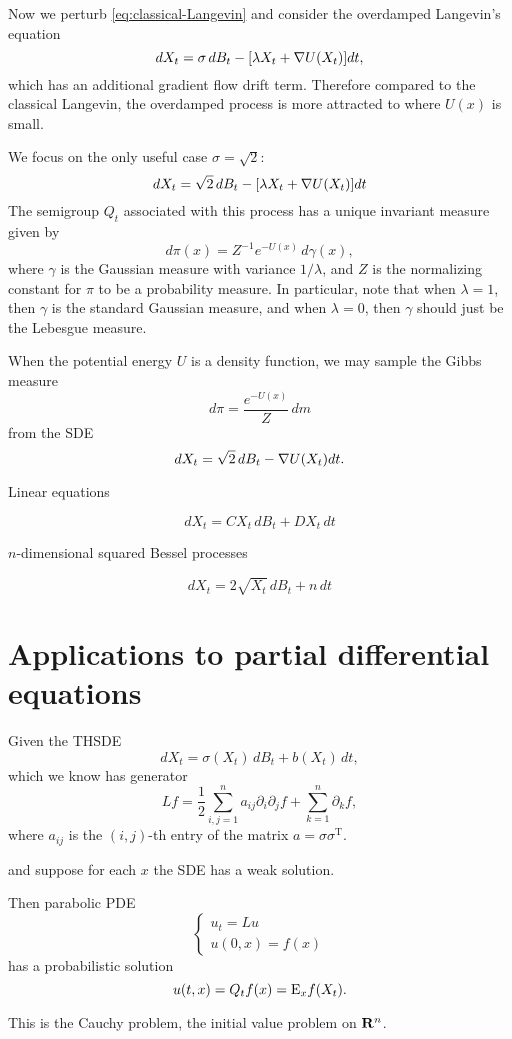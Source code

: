 \documentclass[10pt]{book}
\begin{document}
Now we perturb \eqref{eq:classical-Langevin} and consider the overdamped Langevin's equation \[
    dX_t = \sigma \,dB_t - [\lambda X_t + \nabla U(X_t)]dt,
\] which has an additional gradient flow drift term. Therefore compared to the classical Langevin, the overdamped process is more attracted to where $U(x)$ is small.

We focus on the only useful case $\sigma = \sqrt 2$: \[
    dX_t = \sqrt 2 \,dB_t - [\lambda X_t + \nabla U(X_t)]dt
\]
The semigroup $Q_t$ associated with this process has a unique invariant measure given by \[
    d\pi(x) = Z^{-1}e^{-U(x)}\,d\gamma(x),
\] where $\gamma$ is the Gaussian measure with variance $1/\lambda$, and $Z$ is the normalizing constant for $\pi$ to be a probability measure. In particular, note that when $\lambda = 1$, then $\gamma$ is the standard Gaussian measure, and when $\lambda = 0$, then $\gamma$ should just be the Lebesgue measure. 

When the potential energy $U$ is a density function, we may sample the Gibbs measure \[
     d\pi = \frac{e^{-U(x)}}{Z}\,dm
\] from the SDE \[
    dX_t = \sqrt 2 \,dB_t - \nabla U(X_t)dt.
\]

\cite[Section~12.6.5]{DaPrato_2014}


Linear equations

\[
    dX_t = CX_t\,dB_t +  DX_t\,dt
\]

$n$-dimensional squared Bessel processes

\[
    dX_t = 2\sqrt{X_t} \,dB_t + n\, dt
\]

\section{Applications to partial differential equations}

Given the THSDE \[dX_t = \sigma(X_t)\,dB_t + b(X_t)\,dt,\] which we know has generator \[
    Lf = \frac{1}{2} \sum_{i,j=1}^n a_{ij} \partial_i \partial_j f + \sum_{k=1}^n \partial_k f,
\] where $a_{ij}$ is the $(i,j)$-th entry of the matrix $a = \sigma \sigma^{\mathrm T}$. 

and suppose for each $x$ the SDE has a weak solution.

Then parabolic PDE \[
    \begin{cases}
        u_t = Lu\\
        u(0,x) = f(x)
    \end{cases}
\] has a probabilistic solution \[
    u(t,x) = Q_tf(x) = \mathop{}\!\mathrm{E}_x f(X_t).
\]

This is the Cauchy problem, the initial value problem on $\mathbf{R}^n$.
\end{document}
